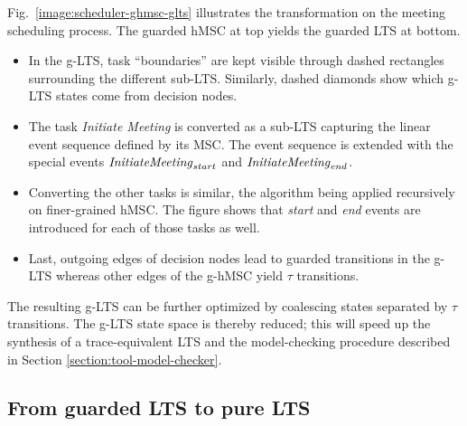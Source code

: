Fig.~\ref{image:scheduler-ghmsc-glts} illustrates the transformation on the meeting scheduling process. The guarded hMSC at top yields the guarded LTS at bottom.
\begin{itemize}
\item In the g-LTS, task ``boundaries'' are kept visible through dashed rectangles surrounding the different sub-LTS.  Similarly, dashed diamonds show which g-LTS states come from decision nodes. 
\item The task \emph{Initiate Meeting} is converted as a sub-LTS capturing the linear event sequence defined by its MSC. The event sequence is extended with the special events $\mbox{\emph{InitiateMeeting}}_{start}$ and $\mbox{\emph{InitiateMeeting}}_{end}$.
\item Converting the other tasks is similar, the algorithm being applied recursively on finer-grained hMSC. The figure shows that \emph{start} and \emph{end} events are introduced for each of those tasks as well. 
\item Last, outgoing edges of decision nodes lead to guarded transitions in the g-LTS whereas other edges of the g-hMSC yield $\tau$ transitions.
\end{itemize}

The resulting g-LTS can be further optimized by coalescing states separated by $\tau$ transitions. The g-LTS state space is thereby reduced; this will speed up the synthesis of a trace-equivalent LTS and the model-checking procedure described in Section \ref{section:tool-model-checker}. 


\subsection{From guarded LTS to pure LTS\label{subsection:from-glts-to-lts}}

